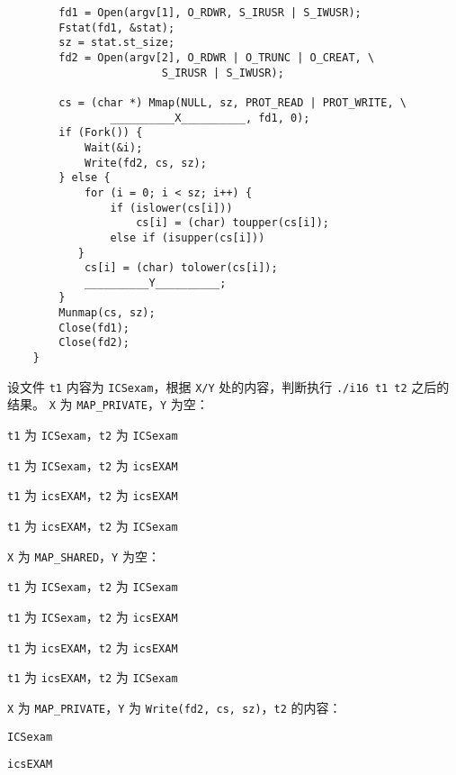 \begin{problems}
\begin{verbatim}
        fd1 = Open(argv[1], O_RDWR, S_IRUSR | S_IWUSR);
        Fstat(fd1, &stat);
        sz = stat.st_size;
        fd2 = Open(argv[2], O_RDWR | O_TRUNC | O_CREAT, \
                        S_IRUSR | S_IWUSR);

        cs = (char *) Mmap(NULL, sz, PROT_READ | PROT_WRITE, \
                __________X__________, fd1, 0);
        if (Fork()) {
            Wait(&i);
            Write(fd2, cs, sz);
        } else {
            for (i = 0; i < sz; i++) {
                if (islower(cs[i]))
                    cs[i] = (char) toupper(cs[i]);
                else if (isupper(cs[i]))
           }
            cs[i] = (char) tolower(cs[i]);
            __________Y__________;
        }
        Munmap(cs, sz);
        Close(fd1);
        Close(fd2);
    }
        \end{verbatim}
        \qn 设文件 \verb|t1| 内容为 \verb|ICSexam|，根据 \verb|X/Y| 处的内容，判断执行 \verb|./i16 t1 t2| 之后的结果。
            \subqn \verb|X| 为 \verb|MAP_PRIVATE|，\verb|Y| 为空：
            \begin{choices}
                \item \verb|t1| 为 \verb|ICSexam|，\verb|t2| 为 \verb|ICSexam|
                \item \verb|t1| 为 \verb|ICSexam|，\verb|t2| 为 \verb|icsEXAM|
                \item \verb|t1| 为 \verb|icsEXAM|，\verb|t2| 为 \verb|icsEXAM|
                \item \verb|t1| 为 \verb|icsEXAM|，\verb|t2| 为 \verb|ICSexam|
            \end{choices}
            \subqn \verb|X| 为 \verb|MAP_SHARED|，\verb|Y| 为空：
            \begin{choices}
                \item \verb|t1| 为 \verb|ICSexam|，\verb|t2| 为 \verb|ICSexam|
                \item \verb|t1| 为 \verb|ICSexam|，\verb|t2| 为 \verb|icsEXAM|
                \item \verb|t1| 为 \verb|icsEXAM|，\verb|t2| 为 \verb|icsEXAM|
                \item \verb|t1| 为 \verb|icsEXAM|，\verb|t2| 为 \verb|ICSexam|
            \end{choices}
            \subqn \verb|X| 为 \verb|MAP_PRIVATE|，\verb|Y| 为 \verb|Write(fd2, cs, sz)|，\verb|t2| 的内容：
            \begin{choices}
                \item \verb|ICSexam|
                \item \verb|icsEXAM|

\end{choices}
\end{problems}
